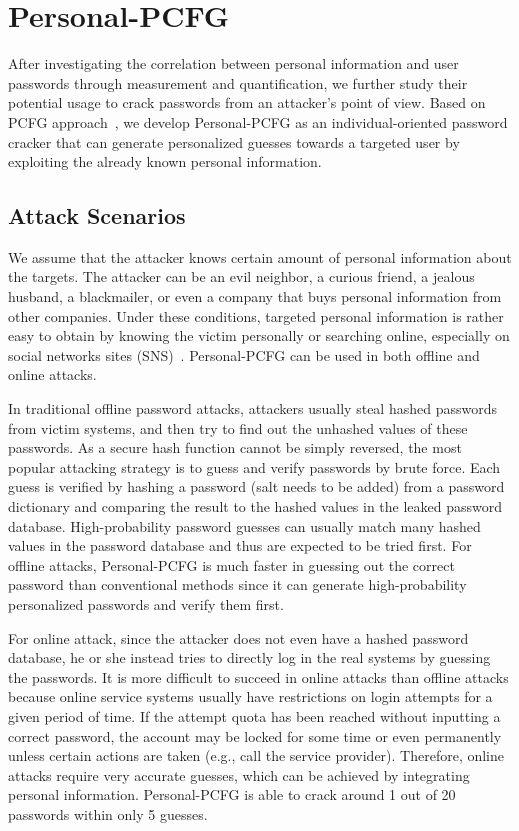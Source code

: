 \section{Personal-PCFG}
\label{personalpcfg}
After investigating the correlation between personal information and user passwords 
through measurement and quantification, we further study their potential usage to crack passwords
from an attacker's point of view. Based on PCFG
approach~\cite{weir2009password},  we develop Personal-PCFG as an individual-oriented
password cracker that can generate personalized guesses towards a targeted user by exploiting the already known personal information.


\subsection{Attack Scenarios}
We assume that the attacker knows certain amount of personal information
about the targets. The attacker can be an evil neighbor, a curious
friend, a jealous husband, a blackmailer, or even a company that buys
personal information from other companies. Under these conditions,
targeted personal information is rather easy to obtain by knowing the
victim personally or searching online, especially on social networks
sites (SNS)~\cite{gross2005information, krishnamurthy2009leakage}.
Personal-PCFG can be used in both offline and online attacks. 

In traditional offline password attacks, attackers usually steal
hashed passwords from victim systems, and then try to find out the
unhashed values of these passwords. As a secure hash function cannot
be simply reversed, the most popular attacking strategy is to guess
and verify passwords by brute force. Each guess is verified by hashing
a password (salt needs to be added) from a password dictionary and
comparing the result to the hashed values in the leaked password
database. High-probability password guesses can usually match many
hashed values in the password database and thus are expected to be
tried first. For offline attacks, Personal-PCFG is much faster in
guessing out the correct password than conventional methods since it
can generate high-probability personalized passwords and verify them
first.

For online attack, since the attacker does not even have a hashed
password database, he or she instead tries to directly log in the real
systems by guessing the passwords. It is more difficult to succeed in
online attacks than offline attacks because online service systems
usually have restrictions on login attempts for a given period of
time. If the attempt quota has been reached without inputting a
correct password, the account may be locked for some time or even
permanently unless certain actions are taken (e.g., call the service
provider). Therefore, online attacks require very accurate guesses, which can be achieved by
integrating personal information. Personal-PCFG is able to crack
around 1 out of 20 passwords within only 5 guesses.

